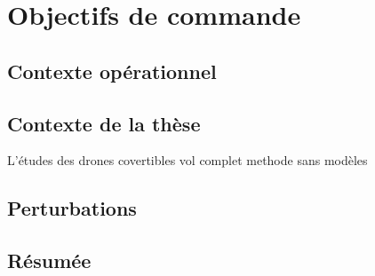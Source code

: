 \chapter{Objectifs de commande}
\minitoc
\label{chap:objectif}

\section{Contexte opérationnel}
\section{Contexte de la thèse}
L'études des drones covertibles 
vol complet 
methode sans modèles 





\section{Perturbations}

\section{Résumée}